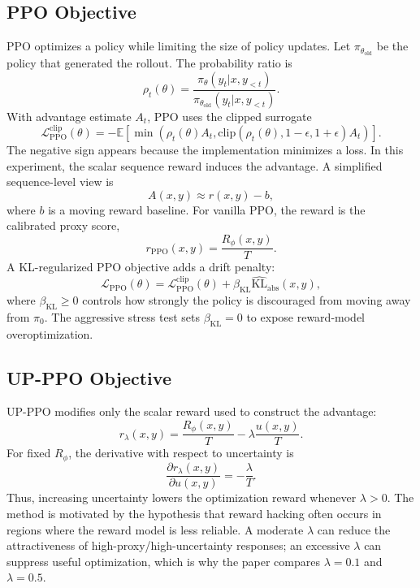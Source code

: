 \documentclass[twocolumn,10pt]{article}
\newcommand{\Rphi}{R_{\phi}}
\newcommand{\kl}{\mathrm{KL}}
\begin{document}
\subsection{PPO Objective}
PPO optimizes a policy while limiting the size of policy updates. Let $\pi_{\theta_{\mathrm{old}}}$ be the policy that generated the rollout. The probability ratio is
\begin{equation}
    \rho_t(\theta)=
    \frac{\pi_\theta(y_t|x,y_{<t})}
         {\pi_{\theta_{\mathrm{old}}}(y_t|x,y_{<t})}.
\end{equation}
With advantage estimate $A_t$, PPO uses the clipped surrogate
\begin{equation}
    \mathcal{L}_{\mathrm{PPO}}^{\mathrm{clip}}(\theta)
    =-\mathbb{E}\left[
    \min\left(\rho_t(\theta)A_t,
    \mathrm{clip}(\rho_t(\theta),1-\epsilon,1+\epsilon)A_t\right)
    \right].
\end{equation}
The negative sign appears because the implementation minimizes a loss. In this experiment, the scalar sequence reward induces the advantage. A simplified sequence-level view is
\begin{equation}
    A(x,y)\approx r(x,y)-b,
\end{equation}
where $b$ is a moving reward baseline. For vanilla PPO, the reward is the calibrated proxy score,
\begin{equation}
    r_{\mathrm{PPO}}(x,y)=\frac{\Rphi(x,y)}{T}.
\end{equation}
A KL-regularized PPO objective adds a drift penalty:
\begin{equation}
    \mathcal{L}_{\mathrm{PPO}}(\theta)
    =\mathcal{L}_{\mathrm{PPO}}^{\mathrm{clip}}(\theta)
    +\beta_{\mathrm{KL}}\widehat{\kl}_{\mathrm{abs}}(x,y),
\end{equation}
where $\beta_{\mathrm{KL}}\geq 0$ controls how strongly the policy is discouraged from moving away from $\pi_0$. The aggressive stress test sets $\beta_{\mathrm{KL}}=0$ to expose reward-model overoptimization.

\subsection{UP-PPO Objective}
UP-PPO modifies only the scalar reward used to construct the advantage:
\begin{equation}
    r_\lambda(x,y)=\frac{\Rphi(x,y)}{T}-\lambda\frac{u(x,y)}{T}.
\end{equation}
For fixed $\Rphi$, the derivative with respect to uncertainty is
\begin{equation}
    \frac{\partial r_\lambda(x,y)}{\partial u(x,y)}=-\frac{\lambda}{T}.
\end{equation}
Thus, increasing uncertainty lowers the optimization reward whenever $\lambda>0$. The method is motivated by the hypothesis that reward hacking often occurs in regions where the reward model is less reliable. A moderate $\lambda$ can reduce the attractiveness of high-proxy/high-uncertainty responses; an excessive $\lambda$ can suppress useful optimization, which is why the paper compares $\lambda=0.1$ and $\lambda=0.5$.
\end{document}
